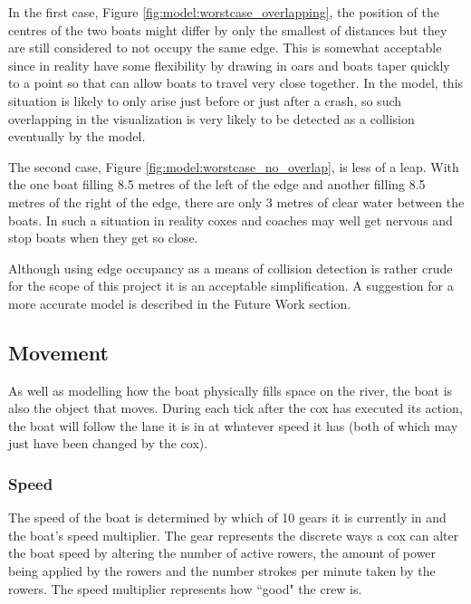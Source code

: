       In the first case, Figure \ref{fig:model:worstcase_overlapping}, the position of the centres of the two boats might differ by only the smallest of distances but they are still considered to not occupy the same edge. This is somewhat acceptable since in reality have some flexibility by drawing in oars and boats taper quickly to a point so  that can allow boats to travel very close together. In the model, this situation is likely to only arise just before or just after a crash, so such overlapping in the visualization is very likely to be detected as a collision eventually by the model.
      
      The second case, Figure \ref{fig:model:worstcase_no_overlap}, is less of a leap. With the one boat filling 8.5 metres of the left of the edge and another filling 8.5 metres of the right of the edge, there are only 3 metres of clear water between the boats. In such a situation in reality coxes and coaches may well get nervous and stop boats when they get so close. 
      
      Although using edge occupancy as a means of collision detection is rather crude for the scope of this project it is an acceptable simplification. A suggestion for a more accurate model is described in the Future Work section.
      
      \subsection{Movement}
      As well as modelling how the boat physically fills space on the river, the boat is also the object that moves. During each tick after the cox has executed its action, the boat will follow the lane it is in at whatever speed it has (both of which may just have been changed by the cox).
      
      \subsubsection{Speed}
      The speed of the boat is determined by which of 10 gears it is currently in and the boat's speed multiplier. The gear represents the discrete ways a cox can alter the boat speed by altering the number of active rowers, the amount of power being applied by the rowers and the number strokes per minute taken by the rowers. The speed multiplier represents how ``good" the crew is. 
      
